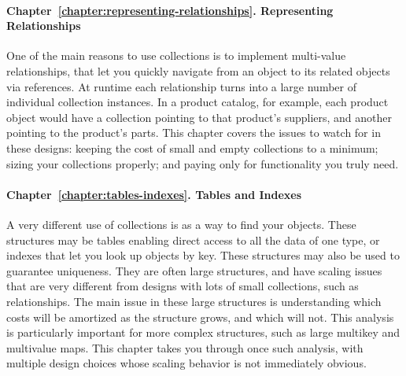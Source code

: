 

\paragraph{Chapter~\ref{chapter:representing-relationships}. Representing
Relationships} One of the main reasons to use collections is to implement
multi-value relationships, that let you quickly navigate from an object
to its related objects via references. At runtime each relationship turns into a
large number of individual collection instances. In a product catalog, for example, 
each product object would have a collection
pointing to that product's suppliers, and another pointing to the product's
parts. This chapter covers the issues to watch for in these designs:
keeping the cost of small and empty collections to a minimum; sizing your collections properly; and paying only for functionality
you truly need.

\paragraph{Chapter~\ref{chapter:tables-indexes}. Tables and Indexes} A very
different use of collections is as a way to find your objects.  These
structures may be tables enabling direct access to all
the data of one type, or indexes that let you look up objects by key. These
structures may also be used to guarantee uniqueness. They are often large structures, and
have scaling issues that are very different from designs with lots of small
collections, such as relationships. The main issue in these large
structures is understanding which costs will be amortized as the structure
grows, and which will not. This analysis is particularly important for more complex structures,
such as large multikey and multivalue maps. This
chapter takes you through once such analysis, with multiple design
choices whose scaling behavior is not immediately obvious.

